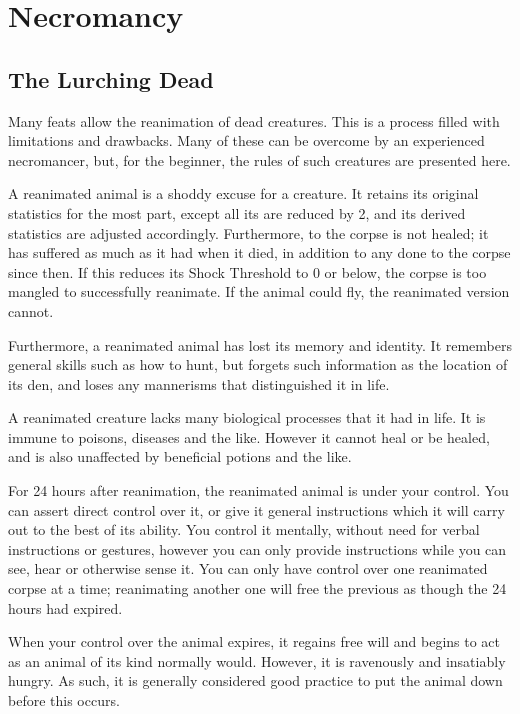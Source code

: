 \chapter{Necromancy}

\section{The Lurching Dead}

Many  feats allow the reanimation of dead creatures.
This is a process filled with limitations and drawbacks.
Many of these can be overcome by an experienced necromancer, but, for the beginner, the rules of such creatures are presented here.

A reanimated animal is a shoddy excuse for a creature.
It retains its original statistics for the most part, except all its  are reduced by 2, and its derived statistics are adjusted accordingly.
Furthermore,  to the corpse is not healed; it has suffered as much  as it had when it died, in addition to any  done to the corpse since then.
If this reduces its Shock Threshold to 0 or below, the corpse is too mangled to successfully reanimate.
If the animal could fly, the reanimated version cannot.

Furthermore, a reanimated animal has lost its memory and identity.
It remembers general skills such as how to hunt, but forgets such information as the location of its den, and loses any mannerisms that distinguished it in life.

A reanimated creature lacks many biological processes that it had in life.
It is immune to poisons, diseases and the like.
However it cannot heal or be healed, and is also unaffected by beneficial potions and the like.

For 24 hours after reanimation, the reanimated animal is under your control.
You can assert direct control over it, or give it general instructions which it will carry out to the best of its ability.
You control it mentally, without need for verbal instructions or gestures, however you can only provide instructions while you can see, hear or otherwise sense it.
You can only have control over one reanimated corpse at a time; reanimating another one will free the previous as though the 24 hours had expired.

When your control over the animal expires, it regains free will and begins to act as an animal of its kind normally would.
However, it is ravenously and insatiably hungry.
As such, it is generally considered good practice to put the animal down before this occurs.


